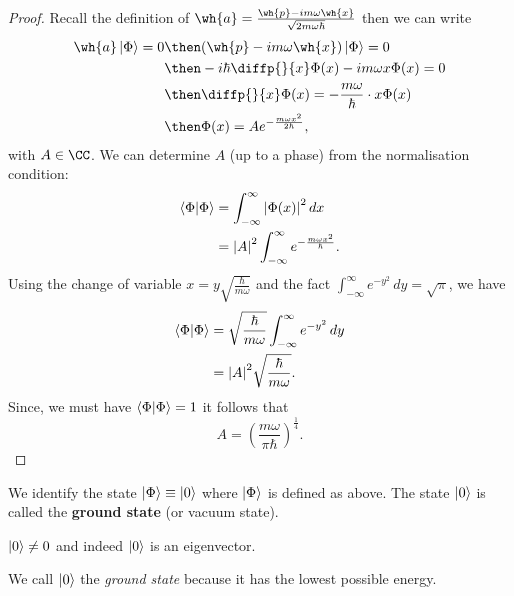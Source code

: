 \documentclass[12pt, a4paper]{article}
\begin{document}
\begin{proof}
    Recall the definition of \(\wh{a}=\frac{\wh{p}-im\omega \wh{x}}{\sqrt{2m\omega \hbar}}\) then we can write 
    \[\begin{aligned}
        \wh{a} \ket{\Phi} =0 &\then (\wh{p}-im\omega \wh{x}) \ket{\Phi} =0 \\
        &\then -i\hbar \diffp{}{x}\Phi(x)-im\omega x\Phi(x)=0 \\
        &\then \diffp{}{x}\Phi(x) = -\frac{m\omega}{\hbar} \cdot x\Phi(x) \\
        &\then \Phi(x) = Ae^{-\frac{m\omega x^2}{2\hbar}},
    \end{aligned}\]
    with \(A \in \CC\). We can determine \(A\) (up to a phase) from the normalisation condition:
    \[\begin{aligned}
        \bra{\Phi} \ket{\Phi} &= \int_{-\infty}^{\infty} \abs{\Phi(x)}^2 \, dx \\
        &= \abs{A}^2 \int_{-\infty}^{\infty} e^{-\frac{m\omega x^2}{\hbar}}.
    \end{aligned}\]
    Using the change of variable \(x= y\sqrt{\frac{\hbar}{m\omega}}\) and the fact \(\int_{-\infty}^{\infty} e^{-y^2} \, dy =\sqrt{\pi}\), we have 
    \[\begin{aligned}
        \bra{\Phi} \ket{\Phi} &= \sqrt{\frac{\hbar}{m\omega}} \int_{-\infty}^{\infty} e^{-y^2} \, dy \\
        &= \abs{A}^2 \sqrt{\frac{\hbar}{m\omega}}.
    \end{aligned}\]
    Since, we must have \(\bra{\Phi} \ket{\Phi} =1\) it follows that 
    \[A = \left( \frac{m\omega}{\pi \hbar} \right)^{\frac{1}{4}}.\]
\end{proof}

\begin{definition}[Notation]
    We identify the state \(\ket{\Phi} \equiv \ket{0}\) where \(\ket{\Phi}\) is defined as above. The state \(\ket{0}\) is called the \textbf{ground state} (or vacuum state).
\end{definition}

\begin{mdremark}
    \(\ket{0} \neq 0\) and indeed \(\ket{0}\) is an eigenvector.
\end{mdremark}

\begin{mdnote}
    We call \(\ket{0}\) the \textit{ground state}  because it has the lowest possible energy.
\end{mdnote}
\end{document}
